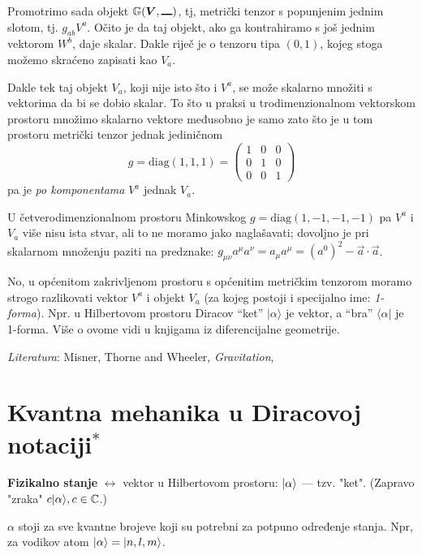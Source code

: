 Promotrimo sada objekt  $\bbtensor{G}(\vec{V},\slot)$, tj, metrički
tenzor s popunjenim jednim slotom, tj. $g_{ab}V^a$. Očito je da
taj objekt, ako ga kontrahiramo s još jednim vektorom $W^{b}$, daje skalar.
Dakle riječ je o tenzoru tipa $(0, 1)$, kojeg stoga možemo skraćeno
zapisati kao $V_a$.

Dakle tek taj objekt $V_a$, koji nije isto što i $V^a$, se može
skalarno množiti s vektorima da bi se dobio skalar. To što u praksi
u trodimenzionalnom vektorskom prostoru množimo skalarno vektore
međusobno je samo zato što je u tom prostoru metrički tenzor
jednak jediničnom 
\begin{displaymath}
g = \text{diag}(1, 1, 1) =
\begin{pmatrix}
1 & 0 & 0 \\ 0 & 1 & 0 \\ 0 & 0 & 1
\end{pmatrix}
\end{displaymath}
pa je \emph{po komponentama} $V^a$ jednak $V_a$.

U četverodimenzionalnom prostoru Minkowskog 
$g = \text{diag}(1, -1, -1, -1)$ pa $V^a$ i $V_a$ više nisu
ista stvar, ali to ne moramo jako naglašavati; dovoljno je
pri skalarnom množenju paziti na predznake:
$g_{\mu \nu} a^{\mu} a^{\nu} = a_{\mu} a^{\mu} = (a^{0})^2 
- \vec{a}\cdot\vec{a}$.

No, u općenitom zakrivljenom prostoru s općenitim metričkim
tenzorom moramo strogo razlikovati vektor $V^a$ i objekt
$V_a$ (za kojeg postoji i specijalno ime: \emph{1-forma}).
Npr. u Hilbertovom prostoru Diracov ``ket'' $|\alpha\rangle$ je
vektor, a ``bra'' $\langle\alpha|$ je 1-forma. Više o ovome
vidi u knjigama iz diferencijalne geometrije.



\emph{Literatura}: Misner, Thorne and Wheeler, \emph{Gravitation},

\section{Kvantna mehanika u Diracovoj notaciji$^*$}

\textbf{Fizikalno stanje} $\leftrightarrow$ vektor u Hilbertovom prostoru:
 $| \alpha \rangle$ --- tzv. "ket". 
 (Zapravo "zraka" $c| \alpha \rangle, c\in\mathbb{C}$.)


$\alpha$ stoji za sve kvantne brojeve koji su potrebni za potpuno
određenje stanja. Npr, za vodikov atom $| \alpha \rangle=| n,l,m \rangle$.

